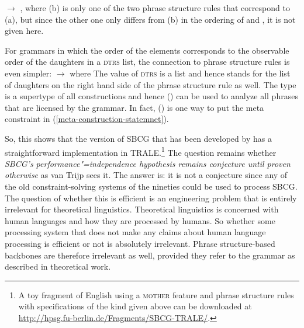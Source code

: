 \ex 
{} $\to$ ,  where 
\zl
(b) is only one of the two phrase structure rules that correspond to (a), but since
the other one only differs from (b) in the ordering of  and , it is not
given here.

For grammars in which the order of the elements corresponds to the observable order of the
daughters in a \textsc{dtrs} list, the connection to phrase structure rules is even simpler:
\ea 
{} $\to$  where 
\z
The value of \textsc{dtrs} is a list and hence  stands for the list of daughters on the right
hand side of the phrase structure rule as well. The type  is a supertype of all
constructions and hence () can be used to analyze all phrases that are licensed by the
grammar. In fact, () is one way to put the meta constraint in (\ref{meta-construction-statemnet}).

So, this shows that the version of SBCG that has been developed by \citet{Sag2012a} has a
straightforward implementation in TRALE.\footnote{%
A toy fragment of English using a \textsc{mother} feature and phrase structure rules with specifications
of the kind given above can be downloaded at \url{http://hpsg.fu-berlin.de/Fragments/SBCG-TRALE/}.%
}
The question remains whether \emph{SBCG's performance"=independence hypothesis remains conjecture until proven otherwise} as van Trijp sees
it. The answer is: it is not a conjecture since any of the old constraint-solving systems of the
nineties could be used to process SBCG. The question of whether this is efficient is an engineering
problem that is entirely irrelevant for theoretical linguistics. Theoretical linguistics is
concerned with human languages and how they are processed by humans. So whether some processing system
that does not make any claims about human language processing is efficient or not is absolutely
irrelevant. Phrase structure-based backbones are therefore irrelevant as well, provided they refer
to the grammar as described in theoretical work.  

